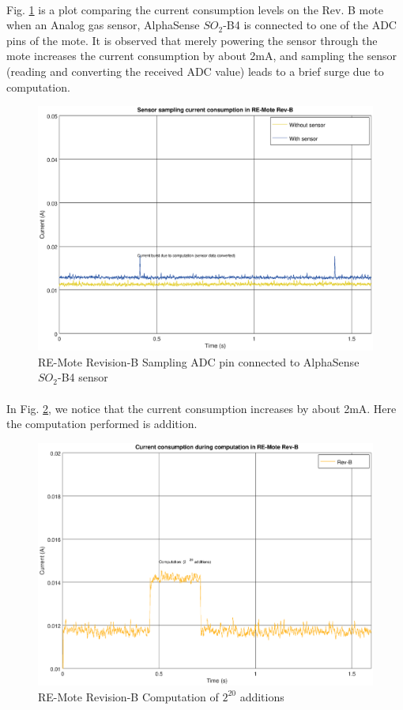 \documentclass[a4paper]{article}
\begin{document}
\paragraph{}
Fig. \ref{fig:revb-sensor} is a plot comparing the current consumption levels on the Rev. B mote when an Analog gas sensor, AlphaSense $SO_2$-B4 is connected to one of the ADC pins of the mote. It is observed that merely powering the sensor through the mote increases the current consumption by about 2mA, and sampling the sensor (reading and converting the received ADC value) leads to a brief surge due to computation.
\begin{figure}[H]
  \centering
  \includegraphics[width=1.0\textwidth]{plots/sensor-onoff-comparison.eps}
  \caption{\label{fig:revb-sensor}RE-Mote Revision-B Sampling ADC pin connected to AlphaSense $SO_2$-B4 sensor}
\end{figure}

\paragraph{}
In Fig. \ref{fig:revb-cmpt}, we notice that the current consumption increases by about 2mA. Here the computation performed is addition.
\begin{figure}[H]
  \centering
  \includegraphics[width=1.0\textwidth]{plots/comp-revb.eps}
  \caption{\label{fig:revb-cmpt}RE-Mote Revision-B Computation of $2^20$ additions}
\end{figure}
\end{document}
